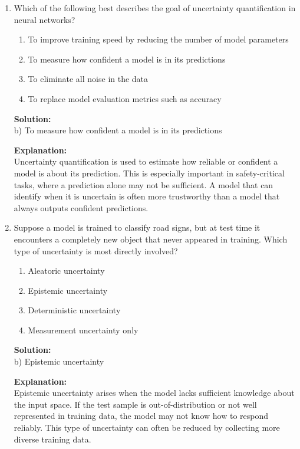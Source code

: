 \documentclass{article}
\begin{document}
\begin{enumerate}

\item Which of the following best describes the goal of uncertainty quantification in neural networks?

\begin{enumerate}
    \item To improve training speed by reducing the number of model parameters
    \item To measure how confident a model is in its predictions
    \item To eliminate all noise in the data
    \item To replace model evaluation metrics such as accuracy
\end{enumerate}

\textbf{Solution:} \\
b) To measure how confident a model is in its predictions

\textbf{Explanation:} \\
Uncertainty quantification is used to estimate how reliable or confident a model is about its prediction. This is especially important in safety-critical tasks, where a prediction alone may not be sufficient. A model that can identify when it is uncertain is often more trustworthy than a model that always outputs confident predictions.

\vspace{2mm}

\item Suppose a model is trained to classify road signs, but at test time it encounters a completely new object that never appeared in training. Which type of uncertainty is most directly involved?

\begin{enumerate}
    \item Aleatoric uncertainty
    \item Epistemic uncertainty
    \item Deterministic uncertainty
    \item Measurement uncertainty only
\end{enumerate}

\textbf{Solution:} \\
b) Epistemic uncertainty

\textbf{Explanation:} \\
Epistemic uncertainty arises when the model lacks sufficient knowledge about the input space. If the test sample is out-of-distribution or not well represented in training data, the model may not know how to respond reliably. This type of uncertainty can often be reduced by collecting more diverse training data.


\end{enumerate}
\end{document}
